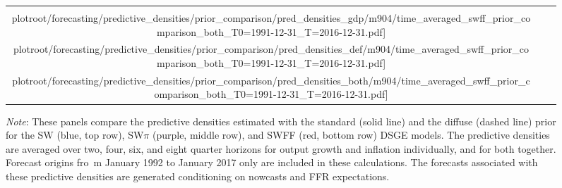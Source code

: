 \documentclass[12pt]{article}
\theoremstyle{definition}
\newcommand\plotroot{../figures_for_paper}
\begin{document}
\begin{figure}[H]
\begin{tabular}{@{\hspace*{-.4cm}}ccc}
        \texttt{[image: \\plotroot/forecasting/predictive\_densities/prior\_comparison/pred\_densities\_gdp/m904/time\_averaged\_swff\_prior\_comparison\_both\_T0=1991-12-31\_T=2016-12-31.pdf]} &
        \texttt{[image: \\plotroot/forecasting/predictive\_densities/prior\_comparison/pred\_densities\_def/m904/time\_averaged\_swff\_prior\_comparison\_both\_T0=1991-12-31\_T=2016-12-31.pdf]} &
        \texttt{[image: \\plotroot/forecasting/predictive\_densities/prior\_comparison/pred\_densities\_both/m904/time\_averaged\_swff\_prior\_comparison\_both\_T0=1991-12-31\_T=2016-12-31.pdf]} \\[-.5ex]
    \end{tabular}
    \begin{minipage}{\textwidth}
        \scriptsize
        \setlength{\baselineskip}{2mm}
        \emph{Note}: These panels compare the predictive densities estimated with the standard   (solid line) and the diffuse  (dashed line) prior for the SW (blue, top row), SW$\pi$ (purple, middle row), and SWFF (red, bottom row) DSGE models. The predictive densities are averaged over two, four, six, and eight quarter horizons for output growth and inflation individually, and for both together. Forecast origins fro\
m January 1992 to January 2017 only are included in these calculations. The forecasts associated with these predictive densities are generated conditioning on nowcasts and FFR expectations.
    \end{minipage}
\end{figure}
\end{document}
